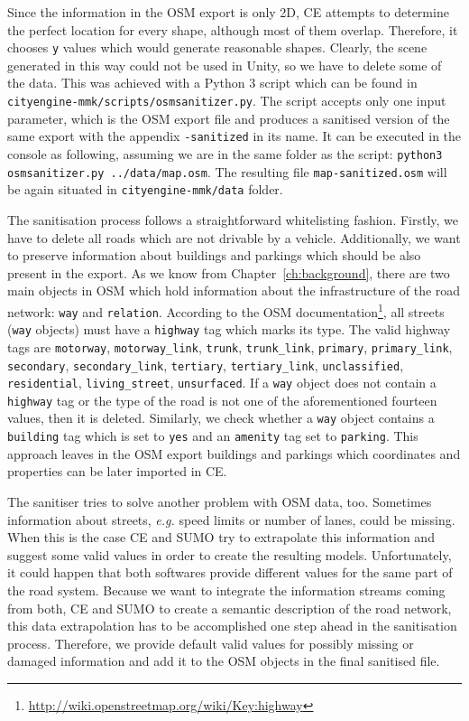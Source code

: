 Since the information in the OSM export is only 2D, CE attempts to determine the perfect location for every shape, although most of them overlap. Therefore, it chooses \texttt{y} values which would generate reasonable shapes. Clearly, the scene generated in this way could not be used in Unity, so we have to delete some of the data. This was achieved with a Python 3 script which can be found in \texttt{cityengine-mmk/scripts/osmsanitizer.py}. The script accepts only one input parameter, which is the OSM export file and produces a sanitised version of the same export with the appendix \texttt{-sanitized} in its name. It can be executed in the console as following, assuming we are in the same folder as the script: \texttt{python3 osmsanitizer.py ../data/map.osm}. The resulting file \texttt{map-sanitized.osm} will be again situated in \texttt{cityengine-mmk/data} folder. 

The sanitisation process follows a straightforward whitelisting fashion. Firstly, we have to delete all roads which are not drivable by a vehicle. Additionally, we want to preserve information about buildings and parkings which should be also present in the export. As we know from Chapter~\ref{ch:background}, there are two main objects in OSM which hold information about the infrastructure of the road network: \texttt{way} and \texttt{relation}. According to the OSM documentation\footnote{\url{http://wiki.openstreetmap.org/wiki/Key:highway}}, all streets (\texttt{way} objects) must have a \texttt{highway} tag which marks its type. The valid highway tags are \texttt{motorway}, \texttt{motorway\_link}, \texttt{trunk}, \texttt{trunk\_link}, \texttt{primary}, \texttt{primary\_link}, \texttt{secondary}, \texttt{secondary\_link}, \texttt{tertiary}, \texttt{tertiary\_link}, \texttt{unclassified}, \texttt{residential}, \texttt{living\_street}, \texttt{unsurfaced}. If a \texttt{way} object does not contain a \texttt{highway} tag or the type of the road is not one of the aforementioned fourteen values, then it is deleted. Similarly, we check whether a \texttt{way} object contains a \texttt{building} tag which is set to \texttt{yes} and an \texttt{amenity} tag set to \texttt{parking}. This approach leaves in the OSM export buildings and parkings which coordinates and properties can be later imported in CE.

The sanitiser tries to solve another problem with OSM data, too. Sometimes information about streets, \emph{e.g.} speed limits or number of lanes, could be missing. When this is the case CE and SUMO try to extrapolate this information and suggest some valid values in order to create the resulting models. Unfortunately, it could happen that both softwares provide different values for the same part of the road system. Because we want to integrate the information streams coming from both, CE and SUMO to create a semantic description of the road network, this data extrapolation has to be accomplished one step ahead in the sanitisation process. Therefore, we provide default valid values for possibly missing or damaged information and add it to the OSM objects in the final sanitised file.

